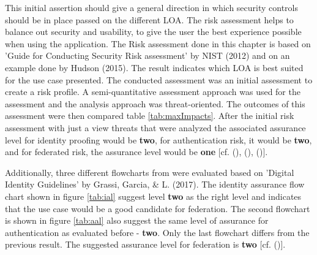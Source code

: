 This initial assertion should give a general direction in which security controls should be in place passed on the different LOA. The risk assessment helps to balance out security and usability, to give the user the best experience possible when using the application. The Risk assessment done in this chapter is based on 'Guide for Conducting Security Risk assessment' by NIST (2012) and on an example done by Hudson (2015). The result indicates which LOA is best suited for the use case presented. The conducted assessment was an initial assessment to create a risk profile. A semi-quantitative assessment approach was used for the assessment and the analysis approach was threat-oriented. The outcomes of this assessment were then compared table \ref{tab:maxImpacts}. After the initial risk assessment with just a view threats that were analyzed the associated assurance level for identity proofing would be \textbf{two}, for authentication risk, it would be \textbf{two}, and for federated risk, the assurance level would be \textbf{one} [cf. (\cite{NIST:2017:DIG}), (\cite{NIST:2018:RMF}), (\cite{Hudson:2015:SecurityRisk})].

Additionally, three different flowcharts from were evaluated based on 'Digital Identity Guidelines' by Grassi, Garcia, \& L. (2017). The identity assurance flow chart shown in figure \ref{tab:ial} suggest level \textbf{two} as the right level and indicates that the use case would be a good candidate for federation. The second flowchart is shown in figure \ref{tab:aal} also suggest the same level of assurance for authentication as evaluated before - \textbf{two}. Only the last flowchart differs from the previous result. The suggested assurance level for federation is \textbf{two} [cf. (\cite{NIST:2017:DIG})].

 
\chapterend
